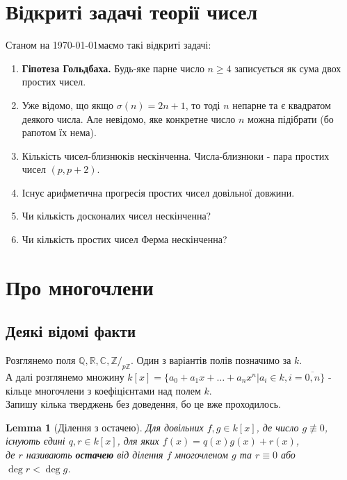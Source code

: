 \documentclass[a4paper, 14pt]{extarticle}
\theoremstyle{theoremdd}
\theoremstyle{theoremdd}
\theoremstyle{theoremdd}
\theoremstyle{theoremdd}
\theoremstyle{theoremdd}
\theoremstyle{theoremdd}
\theoremstyle{theoremdd}
\newtheorem{lemma}[theorem]{Lemma}
\theoremstyle{theoremdd}
\begin{document}
\section*{Відкриті задачі теорії чисел}
Станом на \today маємо такі відкриті задачі:
\begin{enumerate}
\item \textbf{Гіпотеза Гольдбаха.} Будь-яке парне число $n \geq 4$ записується як сума двох простих чисел.
\item Уже відомо, що якщо $\sigma(n) = 2n+1$, то тоді $n$ непарне та є квадратом деякого числа. Але невідомо, яке конкретне число $n$ можна підібрати (бо рапотом їх нема).
\item Кількість чисел-близнюків нескінченна. Числа-близнюки - пара простих чисел $(p,p+2)$.
\item Існує арифметична прогресія простих чисел довільної довжини.
\item Чи кількість досконалих чисел нескінченна?
\item Чи кількість простих чисел Ферма нескінченна?
\end{enumerate}

\iffalse Звісно, тут не всі, але це ті задачі, де мені б хотілось брати безпосередньо участь.
\fi

\iffalse
\newpage
\section*{Про многочлени}
\subsection*{Деякі відомі факти}
Розглянемо поля $\mathbb{Q}, \mathbb{R}, \mathbb{C}, \mathbb{Z} /_{p\mathbb{Z}}$. Один з варіантів полів позначимо за $k$.\\
А далі розглянемо множину $k[x] = \{a_0+a_1x+\dots+a_nx^n | a_i \in k, i = \overline{0,n}\}$ - кільце многочлени з коефіцієнтами над полем $k$.
\bigskip \\
Запишу кілька тверджень без доведення, бо це вже проходилось.

\begin{lemma}[Ділення з остачею]
Для довільних $f,g \in k[x]$, де число $g \not\equiv 0$, існують єдині $q,r \in k[x]$, для яких $f(x) = q(x)g(x) + r(x)$,\\
де $r$ називають \textbf{остачею} від ділення $f$ многочленом $g$ та $r \equiv 0$ або $\deg r < \deg g$.
\end{lemma}
\end{document}

